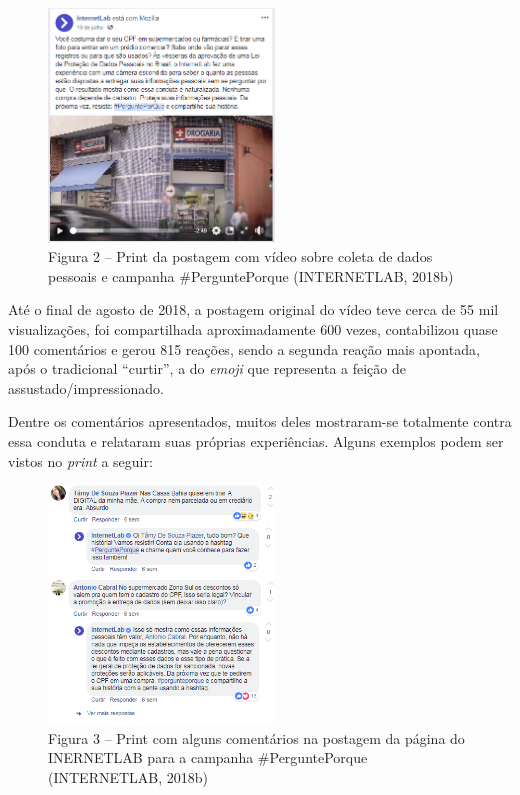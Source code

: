 \begin{figure}[!ht]
  \includegraphics[width=60mm]{./imgs/grafico5.png}
\caption{Figura 2 -- Print da postagem com vídeo sobre coleta de dados pessoais e campanha \#PerguntePorque (INTERNETLAB, 2018b)}
 \end{figure}

Até o final de agosto de 2018, a postagem original do vídeo teve cerca
de 55 mil visualizações, foi compartilhada aproximadamente 600 vezes,
contabilizou quase 100 comentários e gerou 815 reações, sendo a segunda
reação mais apontada, após o tradicional ``curtir'', a do \emph{emoji}
que representa a feição de assustado/impressionado.

Dentre os comentários apresentados, muitos deles mostraram-se totalmente
contra essa conduta e relataram suas próprias experiências. Alguns
exemplos podem ser vistos no \emph{print} a seguir:

\begin{figure}[!ht]
  \includegraphics[width=60mm]{./imgs/grafico6.png}
\caption{Figura 3 -- Print com alguns comentários na postagem da página do INERNETLAB para a campanha \#PerguntePorque (INTERNETLAB, 2018b)}
 \end{figure}

